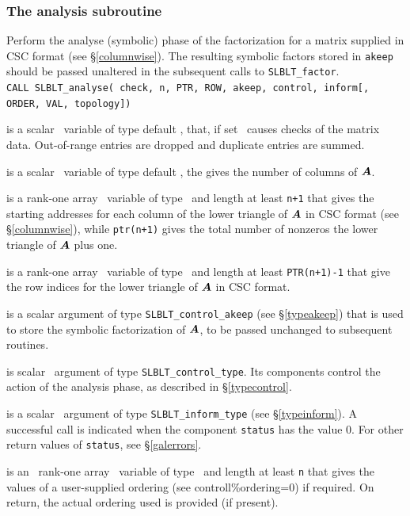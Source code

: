 \documentclass{galahad}
\newcommand{\packagename}{SLBLT}
\begin{document}
\subsubsection{The analysis subroutine}

Perform the analyse (symbolic) phase of the factorization for a matrix
supplied in CSC format (see \S\ref{columnwise}). The resulting symbolic factors
stored in {\tt akeep} should be passed unaltered in the subsequent calls to
{\tt \packagename\_factor}. \\

\hskip0.3in
{\tt CALL \packagename\_analyse( check, n, PTR, ROW, akeep, control, inform{[}, ORDER, VAL, topology{]})}

\begin{description}
is a scalar \intentin\ variable of type default \logical, 
that, if set \true\, causes checks of the matrix data.
Out-of-range entries are dropped and duplicate entries are summed.

 is a scalar \intentin\ variable of type default \integer,
the gives the number of columns of ${\bm{A}}$.

 is a rank-one array \intentin\ variable of type \longinteger\
and length at least {\tt n+1} that gives the starting addresses for each column
 of the lower triangle of ${\bm{A}}$ in CSC format (see \S\ref{columnwise}), 
while {\tt ptr(n+1)} gives the total number of nonzeros
the lower triangle of ${\bm{A}}$ plus one.

 is a rank-one array \intentin\ variable of type \integer\
and length at least {\tt PTR(n+1)-1} that give the 
row indices for the lower triangle of ${\bm{A}}$ in CSC format.

 is a scalar \intentinout argument of type
{\tt \packagename\_control\_akeep}
(see \S\ref{typeakeep}) that is used to store the 
symbolic factorization of ${\bm{A}}$, to be passed unchanged to subsequent routines.

\itt{control} is scalar \intentin\ argument of type
{\tt \packagename\_control\_type}. Its components control the action
of the analysis phase, as described in \S\ref{typecontrol}.

 is a scalar \intentinout\ argument of type
{\tt \packagename\_inform\_type}
(see \S\ref{typeinform}).
A successful call is indicated when the  component {\tt status} has the value 0.
For other return values of {\tt status}, see \S\ref{galerrors}.

\itt{order} is an \optional\ rank-one array \intentinout\ variable of type 
\integer\ and length at least {\tt n} that gives the values of 
a user-supplied ordering (see controll\%ordering=0) if required. 
On return, the actual ordering used is provided (if present).


\end{description}
\end{document}
